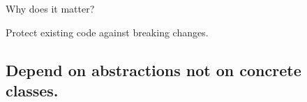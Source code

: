\documentclass{beamer}
\begin{document}
\begin{frame}{Why does it matter?}
    \par Protect existing code against breaking changes.
\end{frame}

\begin{frame}{}
    
\end{frame}

\begin{frame}{}
    
\end{frame}

\subsection{Depend on abstractions not on concrete classes.}

\end{document}
